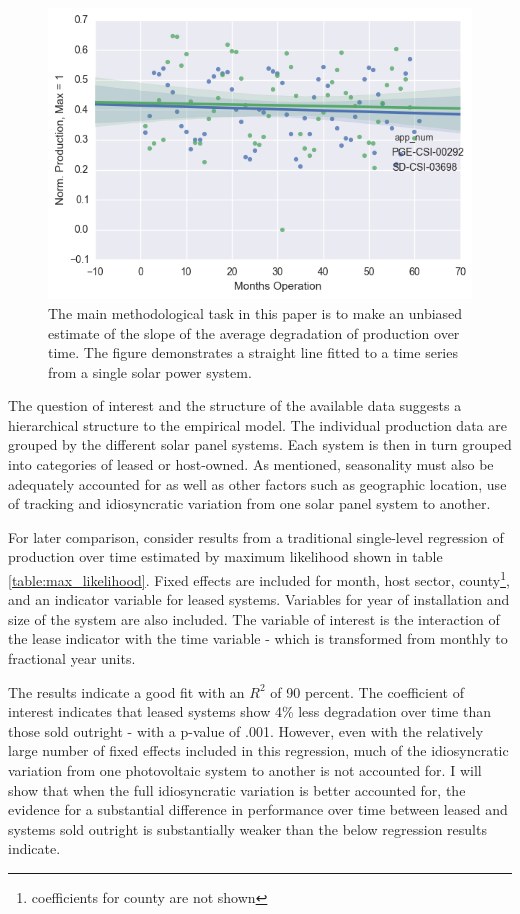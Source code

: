 \documentclass[12pt]{article}
\begin{document}
\begin{figure}
	\includegraphics[width=1\textwidth]{example_prod.png}
	\caption{The main methodological task in this paper is to make an unbiased estimate of the slope of the average degradation of production over time. The figure demonstrates a straight line fitted to a time series from a single solar power system.}
	\label{example_prod}
\end{figure}

The question of interest and the structure of the available data suggests a hierarchical structure to the empirical model. The individual production data are grouped by the different solar panel systems. Each system is then in turn grouped into categories of leased or host-owned. As mentioned, seasonality must also be adequately accounted for as well as other factors such as geographic location, use of tracking and idiosyncratic variation from one solar panel system to another.

For later comparison, consider results from a traditional single-level regression of production over time estimated by maximum likelihood shown in table \ref{table:max_likelihood}. Fixed effects are included for month, host sector, county\footnote{coefficients for county are not shown}, and an indicator variable for leased systems. Variables for year of installation and size of the system are also included. The variable of interest is the interaction of the lease indicator with the time variable - which is transformed from monthly to fractional year units.

The results indicate a good fit with an $R^2$ of 90 percent. The coefficient of interest indicates that leased systems show 4\% less degradation over time than those sold outright - with a p-value of .001. However, even with the relatively large number of fixed effects included in this regression, much of the idiosyncratic variation from one photovoltaic system to another is not accounted for. I will show that when the full idiosyncratic variation is better accounted for, the evidence for a substantial difference in performance over time between leased and systems sold outright is substantially weaker than the below regression results indicate.
\end{document}
